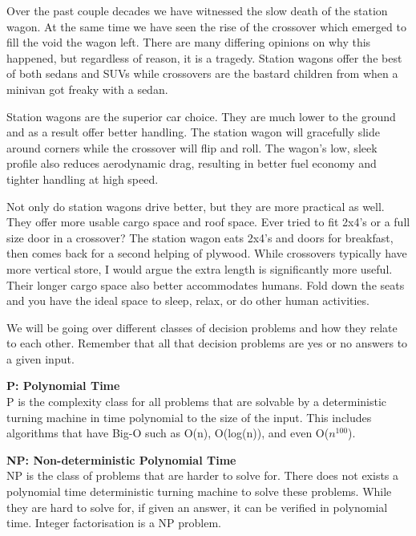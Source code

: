 \documentclass[9pt]{extarticle} %
\begin{document}
\begin{minipage}[t]{.61\linewidth} %
\vspace{-0.4cm}
\hypertarget{firstnews}{}

Over the past couple decades we have witnessed the slow death of the station wagon. At the same time we have seen the rise of the crossover which emerged to fill the void the wagon left. There are many differing opinions on why this happened, but regardless of reason, it is a tragedy. Station wagons offer the best of both sedans and SUVs while crossovers are the bastard children from when a minivan got freaky with a sedan.

Station wagons are the superior car choice. They are much lower to the ground and as a result offer better handling. The station wagon will gracefully slide around corners while the crossover will flip and roll. The wagon's low, sleek profile also reduces aerodynamic drag, resulting in better fuel economy and tighter handling at high speed. 

Not only do station wagons drive better, but they are more practical as well. They offer more usable cargo space and roof space. Ever tried to fit 2x4's or a full size door in a crossover? The station wagon eats 2x4's and doors for breakfast, then comes back for a second helping of plywood. While crossovers typically have more vertical store, I would argue the extra length is significantly more useful. Their longer cargo space also better accommodates humans. Fold down the seats and you have the ideal space to sleep, relax, or do other human activities.


\hypertarget{secondnews}{} 

We will be going over different classes of decision problems and how they relate to each
other. Remember that all that decision problems are yes or no answers to a given input.

\textbf{P: Polynomial Time} \\
P is the complexity class for all problems that are solvable by a deterministic turning machine in
time polynomial to the size of the input. This includes algorithms that have Big-O such as O(n),
O(log(n)), and even O($n^{100}$).

\textbf{NP: Non-deterministic Polynomial Time} \\
NP is the class of problems that are harder to solve for. There does not exists a polynomial time
deterministic turning machine to solve these problems. While they are hard to solve for, if given an
answer, it can be verified in polynomial time. Integer factorisation is a NP problem.


\end{minipage}
\end{document}
